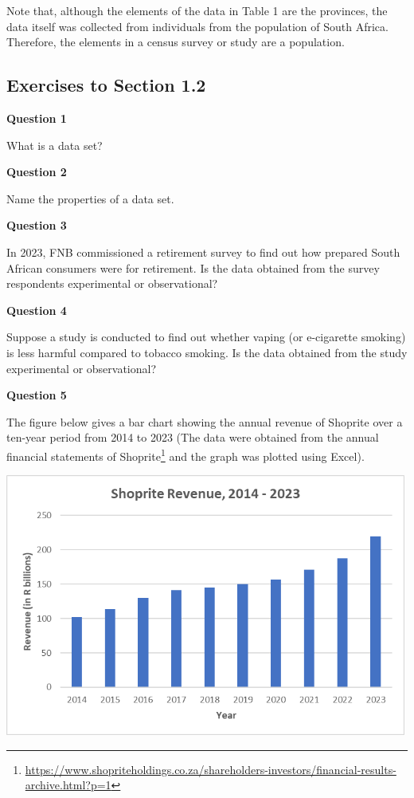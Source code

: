 \documentclass[
]{book}
\begin{document}
Note that, although the elements of the data in Table 1 are the provinces, the data itself was collected from individuals from the population of South Africa. Therefore, the elements in a census survey or study are a population.

\subsection{Exercises to Section 1.2}\label{exercises-to-section-1.2}

\textbf{Question 1}

What is a data set?

\textbf{Question 2}

Name the properties of a data set.

\textbf{Question 3}

In 2023, FNB commissioned a retirement survey to find out how prepared South African consumers were for retirement. Is the data obtained from the survey respondents experimental or observational?

\textbf{Question 4}

Suppose a study is conducted to find out whether vaping (or e-cigarette smoking) is less harmful compared to tobacco smoking. Is the data obtained from the study experimental or observational?

\textbf{Question 5}

The figure below gives a bar chart showing the annual revenue of Shoprite over a ten-year period from 2014 to 2023 (The data were obtained from the annual financial statements of Shoprite\footnote{\url{https://www.shopriteholdings.co.za/shareholders-investors/financial-results-archive.html?p=1}} and the graph was plotted using Excel).

\includegraphics[width=5.20833in,height=\textheight]{images/clipboard-3088691256.png}
\end{document}
